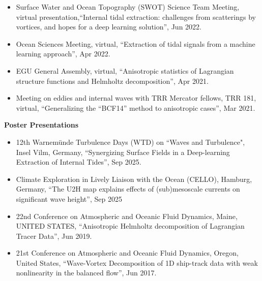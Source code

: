 \documentclass[a4paper,12pt]{article}
\begin{document}
\begin{itemize}[leftmargin=*,noitemsep]
\item Surface Water and Ocean Topography (SWOT) Science Team Meeting, virtual presentation,``Internal tidal extraction: challenges from scatterings by vortices, and hopes for a deep learning solution”, Jun 2022.
\item Ocean Sciences Meeting, virtual, ``Extraction of tidal signals from a machine learning approach”, Apr 2022.
\item EGU General Assembly, virtual, ``Anisotropic statistics of Lagrangian structure functions and Helmholtz decomposition”, Apr 2021.
\item Meeting on eddies and internal waves with TRR Mercator fellows, TRR 181, virtual, ``Generalizing the “BCF14” method to anisotropic cases”, Mar 2021.
\end{itemize}
\textbf{Poster Presentations}
\begin{itemize}[leftmargin=*,noitemsep]
\item 12th Warnem\"{u}nde Turbulence Days (WTD) on ``Waves and Turbulence", Insel Vilm, Germany, ``Synergizing Surface Fields in a Deep-learning Extraction of Internal Tides'', Sep 2025.
\item  Climate Exploration in Lively Liaison with the Ocean (CELLO), Hamburg, Germany, ``The  U2H map  explains effects of (sub)mesoscale currents on significant wave height'', Sep 2025
\item 22nd Conference on Atmospheric and Oceanic Fluid Dynamics, Maine, UNITED STATES, ``Anisotropic Helmholtz decomposition of Lagrangian Tracer Data”, Jun 2019.
\item 21st Conference on Atmospheric and Oceanic Fluid Dynamics, Oregon, United States, ``Wave-Vortex Decomposition of 1D ship-track data with weak nonlinearity in the balanced flow”, Jun 2017.
\end{itemize}
\end{document}
